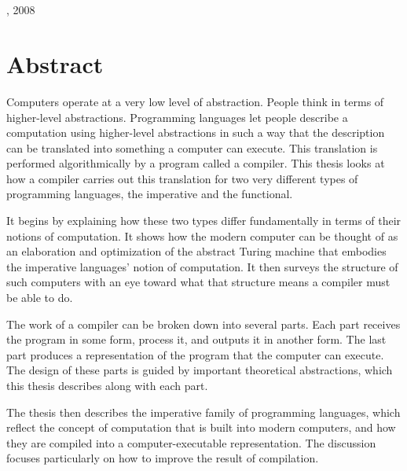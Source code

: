 \begingroup
\let\clearpage\relax
\let\cleardoublepage\relax
\let\cleardoublepage\relax

\begin{center}
    \myDisplayTitle \\ \medskip
  
    \myName \\
    \myUni, 2008
\end{center}

\chapter*{Abstract}
Computers operate at a very low level of abstraction. People think in terms of higher-level abstractions. Programming languages let people describe a computation using higher-level abstractions in such a way that the description can be translated into something a computer can execute. This translation is performed algorithmically by a program called a compiler. This thesis looks at how a compiler carries out this translation for two very different types of programming languages, the imperative and the functional.

It begins by explaining how these two types differ fundamentally in terms of their notions of computation. It shows how the modern computer can be thought of as an elaboration and optimization of the abstract Turing machine that embodies the imperative languages' notion of computation. It then surveys the structure of such computers with an eye toward what that structure means a compiler must be able to do.

The work of a compiler can be broken down into several parts. Each part receives the program in some form, process it, and outputs it in another form. The last part produces a representation of the program that the computer can execute. The design of these parts is guided by important theoretical abstractions, which this thesis describes along with each part.

The thesis then describes the imperative family of programming languages, which reflect the concept of computation that is built into modern computers, and how they are compiled into a computer-executable representation. The discussion focuses particularly on how to improve the result of compilation.

